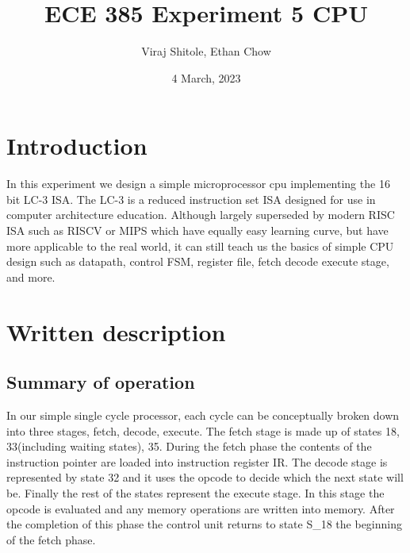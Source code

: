 \documentclass[a4paper,12pt]{report}
\title{ECE 385 Experiment 5 CPU}
\author{Viraj Shitole, Ethan Chow}
\date{4 March, 2023}
\begin{document}
\maketitle

\section{Introduction}
In this experiment we design a simple microprocessor cpu implementing the 16 bit LC-3 ISA. The LC-3 is a reduced instruction set ISA designed for use in computer architecture education. Although largely superseded by modern RISC ISA such as RISCV or MIPS which have equally easy learning curve, but have more applicable to the real world, it can still teach us the basics of simple CPU design such as datapath, control FSM, register file, fetch decode execute stage, and more. 
\section{Written description} 
\subsection{Summary of operation}
In our simple single cycle processor, each cycle can be conceptually broken down into three stages, fetch, decode, execute. The fetch stage is made up of states 18, 33(including waiting states), 35. During the fetch phase the contents of the instruction pointer are loaded into instruction register IR. The decode stage is represented by state 32 and it uses the opcode to decide which the next state will be. Finally the rest of the states represent the execute stage. In this stage the opcode is evaluated and any memory operations are written into memory. After the completion of this phase the control unit returns to state S\_18 the beginning of the fetch phase. 
\end{document}
